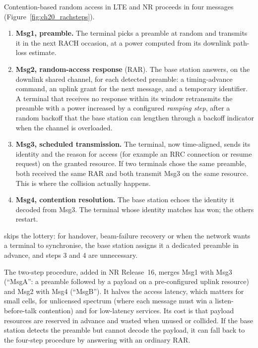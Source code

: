Contention-based random access in LTE and NR proceeds in four messages (Figure~\ref{fig:ch20_rachsteps}).
\begin{enumerate}
\item \textbf{Msg1, preamble.} The terminal picks a preamble at random and transmits it in the next RACH
occasion, at a power computed from its downlink path-loss estimate.
\item \textbf{Msg2, random-access response} (RAR). The base station answers, on the downlink shared channel,
for each detected preamble: a timing-advance command, an uplink grant for the next message, and a temporary
identifier. A terminal that receives no response within its window retransmits the preamble with a power
increased by a configured \emph{ramping step}, after a random backoff that the base station can lengthen
through a backoff indicator when the channel is overloaded.
\item \textbf{Msg3, scheduled transmission.} The terminal, now time-aligned, sends its identity and the reason
for access (for example an RRC connection or resume request) on the granted resource. If two terminals chose
the same preamble, both received the same RAR and both transmit Msg3 on the same resource. This is where the
collision actually happens.
\item \textbf{Msg4, contention resolution.} The base station echoes the identity it decoded from Msg3. The
terminal whose identity matches has won; the others restart.
\end{enumerate}
 skips the lottery: for handover, beam-failure recovery or when the network
wants a terminal to synchronise, the base station assigns it a dedicated preamble in advance, and steps 3 and 4
are unnecessary.

The two-step procedure, added in NR Release~16, merges Msg1 with Msg3 (``MsgA'': a preamble followed by a
payload on a pre-configured uplink resource) and Msg2 with Msg4 (``MsgB''). It halves the access latency,
which matters for small cells, for unlicensed spectrum (where each message must win a listen-before-talk
contention) and for low-latency services. Its cost is that payload resources are reserved in advance and wasted
when unused or collided. If the base station detects the preamble but cannot decode the payload, it can fall
back to the four-step procedure by answering with an ordinary RAR.


